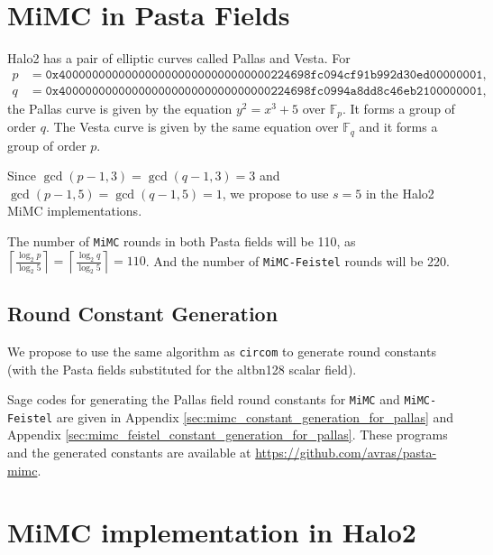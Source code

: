 \documentclass[10pt]{article}
\begin{document}
\section{MiMC in Pasta Fields}%
\label{sec:mimc_in_halo2}
Halo2 has a pair of elliptic curves called Pallas and Vesta. For
\begin{align*}
  p & = \texttt{0x40000000000000000000000000000000224698fc094cf91b992d30ed00000001},\\
  q & = \texttt{0x40000000000000000000000000000000224698fc0994a8dd8c46eb2100000001},
\end{align*}
the Pallas curve is given by the equation $y^2 = x^3+5$ over $\mathbb{F}_p$. It forms a group of order $q$. The Vesta curve is given by the same equation over $\mathbb{F}_q$ and it forms a group of order $p$.

Since $\gcd(p-1, 3) = \gcd(q-1, 3) = 3$ and $\gcd(p-1, 5)=\gcd(q-1, 5)=1$, we propose to use $s=5$ in the Halo2 MiMC implementations.

The number of \texttt{MiMC} rounds in both Pasta fields will be 110, as $\left\lceil \frac{\log_2 p}{\log_2 5} \right\rceil = \left\lceil \frac{\log_2 q}{\log_2 5} \right\rceil = 110$. And the number of \texttt{MiMC-Feistel} rounds will be 220.
\subsection{Round Constant Generation}%
\label{subsec:round_constant_generation}
We propose to use the same algorithm as \texttt{circom} to generate round constants (with the Pasta fields substituted for the alt\textunderscore bn128 scalar field).

Sage codes for generating the Pallas field round constants for \texttt{MiMC} and \texttt{MiMC-Feistel} are given in Appendix \ref{sec:mimc_constant_generation_for_pallas} and Appendix \ref{sec:mimc_feistel_constant_generation_for_pallas}. These programs and the generated constants are available at \url{https://github.com/avras/pasta-mimc}.

\section{MiMC implementation in Halo2}%
\label{sec:mimc_implementation_in_halo2}
\end{document}
